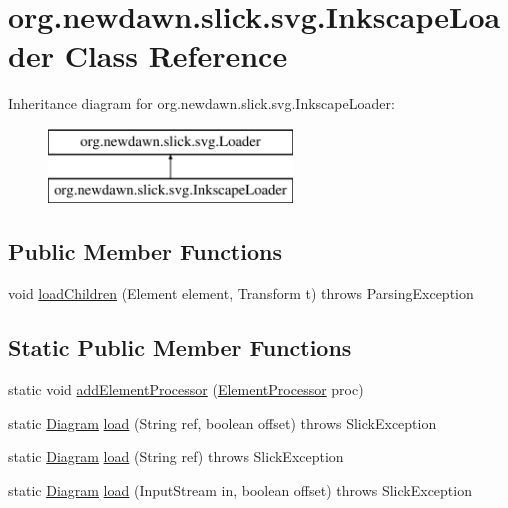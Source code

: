 \hypertarget{classorg_1_1newdawn_1_1slick_1_1svg_1_1_inkscape_loader}{}\section{org.\+newdawn.\+slick.\+svg.\+Inkscape\+Loader Class Reference}
\label{classorg_1_1newdawn_1_1slick_1_1svg_1_1_inkscape_loader}
Inheritance diagram for org.\+newdawn.\+slick.\+svg.\+Inkscape\+Loader\+:\begin{figure}[H]
\begin{center}
\leavevmode
\includegraphics[height=2.000000cm]{classorg_1_1newdawn_1_1slick_1_1svg_1_1_inkscape_loader}
\end{center}
\end{figure}
\subsection*{Public Member Functions}
\begin{DoxyCompactItemize}
\item 
void \mbox{\hyperlink{classorg_1_1newdawn_1_1slick_1_1svg_1_1_inkscape_loader_ac08d33005336e9ca1dedd9c092c35bcb}{load\+Children}} (Element element, Transform t)  throws Parsing\+Exception 
\end{DoxyCompactItemize}
\subsection*{Static Public Member Functions}
\begin{DoxyCompactItemize}
\item 
static void \mbox{\hyperlink{classorg_1_1newdawn_1_1slick_1_1svg_1_1_inkscape_loader_aca7d0aa9cecceab140efa0fb21eea400}{add\+Element\+Processor}} (\mbox{\hyperlink{interfaceorg_1_1newdawn_1_1slick_1_1svg_1_1inkscape_1_1_element_processor}{Element\+Processor}} proc)
\item 
static \mbox{\hyperlink{classorg_1_1newdawn_1_1slick_1_1svg_1_1_diagram}{Diagram}} \mbox{\hyperlink{classorg_1_1newdawn_1_1slick_1_1svg_1_1_inkscape_loader_a740ecc54efa6c6f4794f966ee42585cf}{load}} (String ref, boolean offset)  throws Slick\+Exception 
\item 
static \mbox{\hyperlink{classorg_1_1newdawn_1_1slick_1_1svg_1_1_diagram}{Diagram}} \mbox{\hyperlink{classorg_1_1newdawn_1_1slick_1_1svg_1_1_inkscape_loader_a6033a0097a34ad7c33fe245416606b81}{load}} (String ref)  throws Slick\+Exception 
\item 
static \mbox{\hyperlink{classorg_1_1newdawn_1_1slick_1_1svg_1_1_diagram}{Diagram}} \mbox{\hyperlink{classorg_1_1newdawn_1_1slick_1_1svg_1_1_inkscape_loader_a315ddcd083502a6f86361ed87372673e}{load}} (Input\+Stream in, boolean offset)  throws Slick\+Exception 
\end{DoxyCompactItemize}

